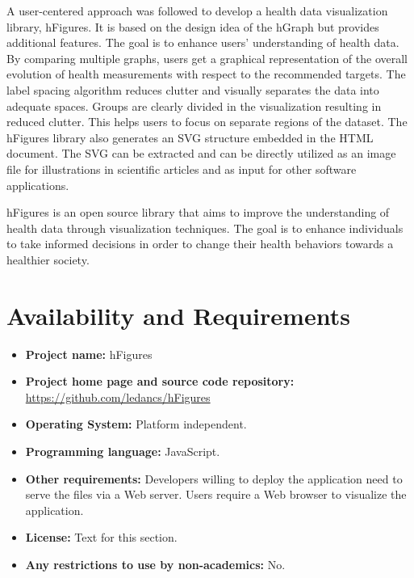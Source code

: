 \documentclass[twocolumn]{bmcart}%
\begin{document}
A user-centered approach was followed to develop a health data visualization library, hFigures. It is based on the design idea of the hGraph but provides additional features. The goal is to enhance users' understanding of health data.
By comparing multiple graphs, users get a graphical representation of the overall evolution of health measurements with respect to the recommended targets. The label spacing algorithm reduces clutter and visually separates the data into adequate spaces. Groups are clearly divided in the visualization resulting in reduced clutter. This helps users to focus on separate regions of the dataset. The hFigures library also generates an SVG structure embedded in the HTML document. The SVG can be extracted and can be directly utilized as an image file for illustrations in scientific articles and as input for other software applications.

hFigures is an open source library that aims to improve the understanding of health data through visualization techniques. The goal is to enhance individuals to take informed decisions in order to change their health behaviors towards a healthier society.


\section*{Availability and Requirements}

\begin{itemize}
\item \textbf{Project name:} hFigures
\item \textbf{Project home page and source code repository:} \url{https://github.com/ledancs/hFigures}
\item \textbf{Operating System:} Platform independent.
\item \textbf{Programming language:} JavaScript.
\item \textbf{Other requirements:} Developers willing to deploy the application need to serve the files via a Web server. Users require a Web browser to visualize the application.
\item \textbf{License:} Text for this section.
\item \textbf{Any restrictions to use by non-academics:} No.
\end{itemize}

\end{document}
